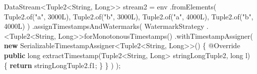 \documentclass[cn,11pt,chinese]{elegantbook}
\newenvironment{Shaded}{}{}
\newcommand{\AttributeTok}[1]{\textcolor[rgb]{0.49,0.56,0.16}{#1}}
\newcommand{\BuiltInTok}[1]{#1}
\newcommand{\DataTypeTok}[1]{\textcolor[rgb]{0.56,0.13,0.00}{#1}}
\newcommand{\DecValTok}[1]{\textcolor[rgb]{0.25,0.63,0.44}{#1}}
\newcommand{\FunctionTok}[1]{\textcolor[rgb]{0.02,0.16,0.49}{#1}}
\newcommand{\KeywordTok}[1]{\textcolor[rgb]{0.00,0.44,0.13}{\textbf{#1}}}
\newcommand{\NormalTok}[1]{#1}
\newcommand{\StringTok}[1]{\textcolor[rgb]{0.25,0.44,0.63}{#1}}
\begin{document}
\begin{Shaded}
\begin{Highlighting}[]
\NormalTok{        DataStream\textless{}Tuple2\textless{}}\BuiltInTok{String}\NormalTok{, }\BuiltInTok{Long}\NormalTok{\textgreater{}\textgreater{} stream2 = env}
\NormalTok{            .}\FunctionTok{fromElements}\NormalTok{(}
\NormalTok{                Tuple2.}\FunctionTok{of}\NormalTok{(}\StringTok{"a"}\NormalTok{, }\DecValTok{3000L}\NormalTok{),}
\NormalTok{                Tuple2.}\FunctionTok{of}\NormalTok{(}\StringTok{"b"}\NormalTok{, }\DecValTok{3000L}\NormalTok{),}
\NormalTok{                Tuple2.}\FunctionTok{of}\NormalTok{(}\StringTok{"a"}\NormalTok{, }\DecValTok{4000L}\NormalTok{),}
\NormalTok{                Tuple2.}\FunctionTok{of}\NormalTok{(}\StringTok{"b"}\NormalTok{, }\DecValTok{4000L}\NormalTok{)}
\NormalTok{            )}
\NormalTok{            .}\FunctionTok{assignTimestampsAndWatermarks}\NormalTok{(}
\NormalTok{                WatermarkStrategy}
\NormalTok{                    .\textless{}Tuple2\textless{}}\BuiltInTok{String}\NormalTok{, }\BuiltInTok{Long}\NormalTok{\textgreater{}\textgreater{}}\FunctionTok{forMonotonousTimestamps}\NormalTok{()}
\NormalTok{                    .}\FunctionTok{withTimestampAssigner}\NormalTok{(}
                        \KeywordTok{new}\NormalTok{ SerializableTimestampAssigner\textless{}Tuple2\textless{}}\BuiltInTok{String}\NormalTok{, }\BuiltInTok{Long}\NormalTok{\textgreater{}\textgreater{}() \{}
                            \AttributeTok{@Override}
                            \KeywordTok{public} \DataTypeTok{long} \FunctionTok{extractTimestamp}\NormalTok{(Tuple2\textless{}}\BuiltInTok{String}\NormalTok{, }\BuiltInTok{Long}\NormalTok{\textgreater{} stringLongTuple2, }\DataTypeTok{long}\NormalTok{ l) \{}
                                \KeywordTok{return}\NormalTok{ stringLongTuple2.}\FunctionTok{f1}\NormalTok{;}
\NormalTok{                            \}}
\NormalTok{                        \}}
\NormalTok{                    )}
\NormalTok{            );}


\end{Highlighting}
\end{Shaded}
\end{document}
